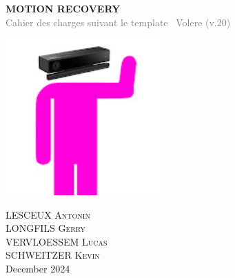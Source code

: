 \begin{titlepage}
    \setlength{\topmargin}{4cm} %
    \begin{center}
        \vfill 
        \begin{minipage}{0.8\textwidth}
            \centering
            {\Huge \textbf{\uppercase{Motion Recovery}}}\\ %
            \vspace{4mm}
            {\small \textcolor{gray}{\hfill Cahier des charges suivant le template~\cite{volere20} Volere (v.20)}}
        \end{minipage}
        
        \vspace{15mm}
        \includegraphics[height=6cm]{images/motion-recovery-logo.jpeg} %
        \vspace{30mm}
        
        \begin{minipage}{0.7\textwidth}
            \centering
            \textsc{LESCEUX Antonin}\\
            \vspace{3mm}
            \textsc{LONGFILS Gerry}\\
            \vspace{3mm}
            \textsc{VERVLOESSEM Lucas}\\
            \vspace{3mm}
            \textsc{SCHWEITZER Kevin}\\
            \vspace{10mm}
            December 2024
        \end{minipage}
        \vfill
    \end{center}
\end{titlepage}